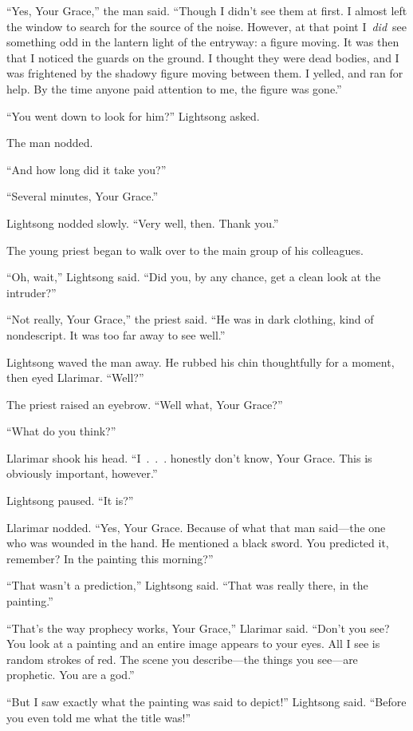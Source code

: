 “Yes, Your Grace,” the man said. “Though I didn’t see them at first. I almost left the window to search for the source of the noise. However, at that point I~\textit{did}~see something odd in the lantern light of the entryway: a figure moving. It was then that I noticed the guards on the ground. I thought they were dead bodies, and I was frightened by the shadowy figure moving between them. I yelled, and ran for help. By the time anyone paid attention to me, the figure was gone.”

“You went down to look for him?” Lightsong asked.

The man nodded.

“And how long did it take you?”

“Several minutes, Your Grace.”

Lightsong nodded slowly. “Very well, then. Thank you.”

The young priest began to walk over to the main group of his colleagues.

“Oh, wait,” Lightsong said. “Did you, by any chance, get a clean look at the intruder?”

“Not really, Your Grace,” the priest said. “He was in dark clothing, kind of nondescript. It was too far away to see well.”

Lightsong waved the man away. He rubbed his chin thoughtfully for a moment, then eyed Llarimar. “Well?”

The priest raised an eyebrow. “Well what, Your Grace?”

“What do you think?”

Llarimar shook his head. “I~.~.~. honestly don’t know, Your Grace. This is obviously important, however.”

Lightsong paused. “It is?”

Llarimar nodded. “Yes, Your Grace. Because of what that man said—the one who was wounded in the hand. He mentioned a black sword. You predicted it, remember? In the painting this morning?”

“That wasn’t a prediction,” Lightsong said. “That was really there, in the painting.”

“That’s the way prophecy works, Your Grace,” Llarimar said. “Don’t you see? You look at a painting and an entire image appears to your eyes. All I see is random strokes of red. The scene you describe—the things you see—are prophetic. You are a god.”

“But I saw exactly what the painting was said to depict!” Lightsong said. “Before you even told me what the title was!”

